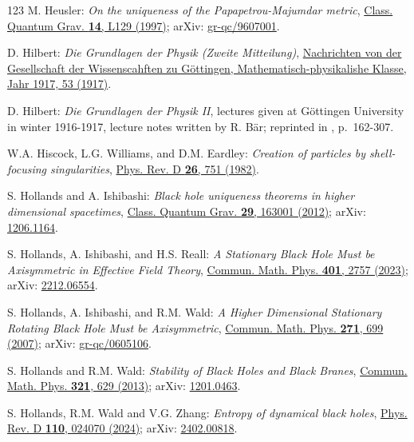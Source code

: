 \begin{thebibliography}{123}
M. Heusler:
{\em On the uniqueness of the Papapetrou-Majumdar metric},
\href{https://doi.org/10.1088/0264-9381/14/7/001}{Class. Quantum Grav. {\bf 14}, L129 (1997)};
arXiv: \href{https://arxiv.org/abs/gr-qc/9607001}{gr-qc/9607001}.

D. Hilbert:
{\em Die Grundlagen der Physik (Zweite Mitteilung)},
\href{https://gdz.sub.uni-goettingen.de/id/PPN252457811_1917}{Nachrichten von der Gesellschaft der Wissenscahften zu Göttingen, Mathematisch-physikalishe Klasse, Jahr 1917, 53 (1917)}.

D. Hilbert:
{\em Die Grundlagen der Physik II},
lectures given at Göttingen University in winter 1916-1917,
lecture notes written by R. Bär; reprinted
in \cite{SauerM09}, p.~162-307.

W.A. Hiscock, L.G. Williams, and D.M. Eardley:
{\em Creation of particles by shell-focusing singularities},
\href{https://doi.org/10.1103/PhysRevD.26.751}{Phys. Rev. D {\bf 26}, 751 (1982)}.

S. Hollands and A. Ishibashi:
{\em Black hole uniqueness theorems in higher dimensional spacetimes},
\href{https://doi.org/10.1088/0264-9381/29/16/163001}{Class. Quantum Grav. {\bf 29}, 163001 (2012)};
arXiv: \href{https://arxiv.org/abs/1206.1164}{1206.1164}.

S. Hollands, A. Ishibashi, and H.S. Reall:
{\em A Stationary Black Hole Must be Axisymmetric in Effective Field Theory},
\href{https://doi.org/10.1007/s00220-023-04700-1}{Commun. Math. Phys. {\bf 401}, 2757 (2023)};
arXiv: \href{https://arxiv.org/abs/2212.06554}{2212.06554}.

S. Hollands, A. Ishibashi, and R.M. Wald:
{\em A Higher Dimensional Stationary Rotating Black Hole Must be Axisymmetric},
\href{https://doi.org/10.1007/s00220-007-0216-4}{Commun. Math. Phys. {\bf 271}, 699 (2007)};
arXiv: \href{https://arxiv.org/abs/gr-qc/0605106}{gr-qc/0605106}.

S. Hollands and R.M. Wald:
{\em Stability of Black Holes and Black Branes},
\href{https://doi.org/10.1007/s00220-012-1638-1}{Commun. Math. Phys. {\bf 321}, 629 (2013)};
arXiv: \href{https://arxiv.org/abs/1201.0463}{1201.0463}.

S. Hollands, R.M. Wald and V.G. Zhang:
{\em Entropy of dynamical black holes},
\href{https://doi.org/10.1103/PhysRevD.110.024070}{Phys. Rev. D {\bf 110}, 024070 (2024)};
arXiv: \href{https://arxiv.org/abs/2402.00818}{2402.00818}.


\end{thebibliography}
